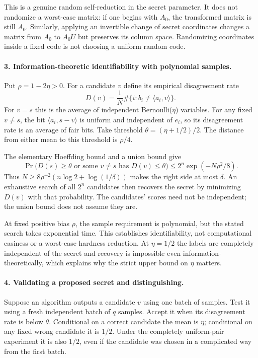 \documentclass[11pt]{article}
\begin{document}
This is a genuine random self-reduction in the secret parameter. It does not randomize a worst-case matrix: if one begins with $A_0$, the transformed matrix is still $A_0$. Similarly, applying an invertible change of secret coordinates changes a matrix from $A_0$ to $A_0U$ but preserves its column space. Randomizing coordinates inside a fixed code is not choosing a uniform random code.

\paragraph{3. Information-theoretic identifiability with polynomial samples.}
Put $\rho=1-2\eta>0$. For a candidate $v$ define its empirical disagreement rate
\[
 D(v)=\frac1N\#\{i:b_i\ne\langle a_i,v\rangle\}.
\]
For $v=s$ this is the average of independent Bernoulli($\eta$) variables. For any fixed $v\ne s$, the bit $\langle a_i,s-v\rangle$ is uniform and independent of $e_i$, so its disagreement rate is an average of fair bits. Take threshold $\theta=(\eta+1/2)/2$. The distance from either mean to this threshold is $\rho/4$.

The elementary Hoeffding bound and a union bound give
\[
 \Pr\bigl(D(s)\ge\theta\text{ or some }v\ne s
                  \text{ has }D(v)\le\theta\bigr)
 \le 2^n\exp(-N\rho^2/8).
\]
Thus $N\ge8\rho^{-2}(n\log2+\log(1/\delta))$ makes the right side at most $\delta$. An exhaustive search of all $2^n$ candidates then recovers the secret by minimizing $D(v)$ with that probability. The candidates' scores need not be independent; the union bound does not assume they are.

At fixed positive bias $\rho$, the sample requirement is polynomial, but the stated search takes exponential time. This establishes identifiability, not computational easiness or a worst-case hardness reduction. At $\eta=1/2$ the labels are completely independent of the secret and recovery is impossible even information-theoretically, which explains why the strict upper bound on $\eta$ matters.

\paragraph{4. Validating a proposed secret and distinguishing.}
Suppose an algorithm outputs a candidate $v$ using one batch of samples. Test it using a fresh independent batch of $q$ samples. Accept it when its disagreement rate is below $\theta$. Conditional on a correct candidate the mean is $\eta$; conditional on any fixed wrong candidate it is $1/2$. Under the completely uniform-pair experiment it is also $1/2$, even if the candidate was chosen in a complicated way from the first batch.
\end{document}
